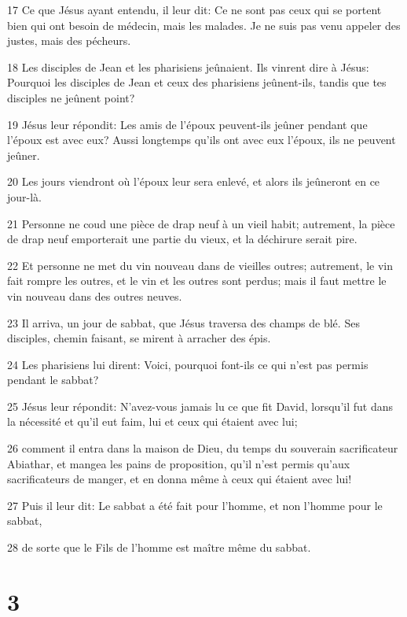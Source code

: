 \par 17 Ce que Jésus ayant entendu, il leur dit: Ce ne sont pas ceux qui se portent bien qui ont besoin de médecin, mais les malades. Je ne suis pas venu appeler des justes, mais des pécheurs.
\par 18 Les disciples de Jean et les pharisiens jeûnaient. Ils vinrent dire à Jésus: Pourquoi les disciples de Jean et ceux des pharisiens jeûnent-ils, tandis que tes disciples ne jeûnent point?
\par 19 Jésus leur répondit: Les amis de l'époux peuvent-ils jeûner pendant que l'époux est avec eux? Aussi longtemps qu'ils ont avec eux l'époux, ils ne peuvent jeûner.
\par 20 Les jours viendront où l'époux leur sera enlevé, et alors ils jeûneront en ce jour-là.
\par 21 Personne ne coud une pièce de drap neuf à un vieil habit; autrement, la pièce de drap neuf emporterait une partie du vieux, et la déchirure serait pire.
\par 22 Et personne ne met du vin nouveau dans de vieilles outres; autrement, le vin fait rompre les outres, et le vin et les outres sont perdus; mais il faut mettre le vin nouveau dans des outres neuves.
\par 23 Il arriva, un jour de sabbat, que Jésus traversa des champs de blé. Ses disciples, chemin faisant, se mirent à arracher des épis.
\par 24 Les pharisiens lui dirent: Voici, pourquoi font-ils ce qui n'est pas permis pendant le sabbat?
\par 25 Jésus leur répondit: N'avez-vous jamais lu ce que fit David, lorsqu'il fut dans la nécessité et qu'il eut faim, lui et ceux qui étaient avec lui;
\par 26 comment il entra dans la maison de Dieu, du temps du souverain sacrificateur Abiathar, et mangea les pains de proposition, qu'il n'est permis qu'aux sacrificateurs de manger, et en donna même à ceux qui étaient avec lui!
\par 27 Puis il leur dit: Le sabbat a été fait pour l'homme, et non l'homme pour le sabbat,
\par 28 de sorte que le Fils de l'homme est maître même du sabbat.

\chapter{3}

